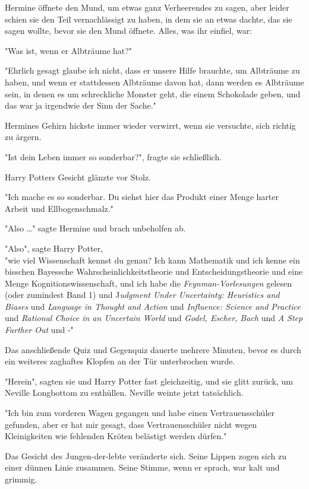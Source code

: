 {Hermine öffnete den Mund, um etwas ganz Verheerendes zu sagen, aber leider schien sie den Teil vernachlässigt zu haben, in dem sie an etwas dachte, das sie sagen wollte, bevor sie den Mund öffnete. Alles, was ihr einfiel, war:

"Was ist, wenn er Albträume hat?"

"Ehrlich gesagt glaube ich nicht, dass er unsere Hilfe brauchte, um Albträume zu haben, und wenn er stattdessen Albträume davon hat, dann werden es Albträume sein, in denen es um schreckliche Monster geht, die einem Schokolade geben, und das war ja irgendwie der Sinn der Sache."

Hermines Gehirn hickste immer wieder verwirrt, wenn sie versuchte, sich richtig zu ärgern.

"Ist dein Leben immer so sonderbar?", fragte sie schließlich.

Harry Potters Gesicht glänzte vor Stolz.

"Ich mache es so sonderbar. Du siehst hier das Produkt einer Menge harter Arbeit und Ellbogenschmalz."

"Also …" sagte Hermine und brach unbeholfen ab.

"Also", sagte Harry Potter,\\ "wie viel Wissenschaft kennst du genau? Ich kann Mathematik und ich kenne ein bisschen Bayessche Wahrscheinlichkeitstheorie und Entscheidungstheorie und eine Menge Kognitionswissenschaft, und ich habe die \emph{Feynman-Vorlesungen} gelesen (oder zumindest Band 1) und J\emph{udgment Under Uncertainty: Heuristics and Biases} und \emph{Language in Thought and Action} und \emph{Influence: Science and Practice} und \emph{Rational Choice in an Uncertain World} und \emph{Godel, Escher, Bach} und \emph{A Step Farther Out} und -"

Das anschließende Quiz und Gegenquiz dauerte mehrere Minuten, bevor es durch ein weiteres zaghaftes Klopfen an der Tür unterbrochen wurde.

"Herein", sagten sie und Harry Potter fast gleichzeitig, und sie glitt zurück, um Neville Longbottom zu enthüllen. Neville weinte jetzt tatsächlich.

"Ich bin zum vorderen Wagen gegangen und habe einen Vertrauensschüler gefunden, aber er hat mir gesagt, dass Vertrauensschüler nicht wegen Kleinigkeiten wie fehlenden Kröten belästigt werden dürfen."

Das Gesicht des Jungen-der-lebte veränderte sich. Seine Lippen zogen sich zu einer dünnen Linie zusammen. Seine Stimme, wenn er sprach, war kalt und grimmig.

}
